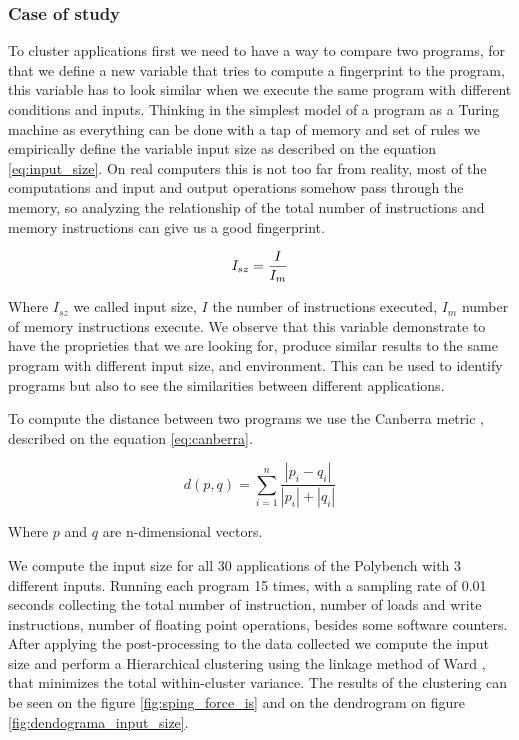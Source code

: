 \subsubsection{Case of study} \label{subsec:ftv_case_of_study}

To cluster applications first we need to have a way to compare two programs, for that we define a new variable that tries to compute a fingerprint to the program, this variable has to look similar when we execute the same program with different conditions and inputs. Thinking in the simplest model of a program as a Turing machine as everything can be done with a tap of memory and set of rules we empirically define the variable input size as described on the equation \ref{eq:input_size}. On real computers this is not too far from reality, most of the computations and input and output operations somehow pass through the memory, so analyzing the relationship of the total number of instructions and memory instructions can give us a good fingerprint.

\begin{equation}
	I_{sz} = \frac{I}{I_{m}} \\
	\label{eq:input_size}
\end{equation}

Where $I_{sz}$ we called input size, $I$ the number of instructions executed, $I_m$ number of memory instructions execute. We observe that this variable demonstrate to have the proprieties that we are looking for, produce similar results to the same program with different input size, and environment. This can be used to identify programs but also to see the similarities between different applications.

To compute the distance between two programs we use the Canberra metric \cite{Jurman2009CanberraLists}, described on the equation \ref{eq:canberra}.

\begin{equation}
	d(p,q)= \sum_{i=1}^{n}{\frac{|p_i-q_i|}{|p_i|+|q_i|}}
	\label{eq:canberra}
\end{equation}

Where $p$ and $q$ are n-dimensional vectors.

We compute the input size for all 30 applications of the Polybench with 3 different inputs. Running each program 15 times, with a sampling rate of 0.01 seconds collecting the total number of instruction, number of loads and write instructions, number of floating point operations, besides some software counters. After applying the post-processing to the data collected we compute the input size and perform a Hierarchical clustering using the linkage method of Ward \cite{Murtagh2011WardsAlgorithm}, that minimizes the total within-cluster variance. The results of the clustering can be seen on the figure \ref{fig:sping_force_is} and on the dendrogram on figure \ref{fig:dendograma_input_size}.

